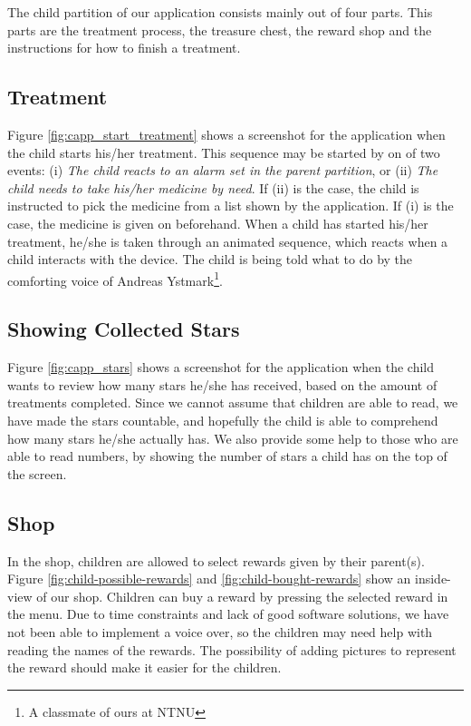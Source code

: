 The child partition of our application consists mainly out of four parts. This parts are the treatment process, the treasure chest, the reward shop and the instructions for how to finish a treatment.

\subsection{Treatment}
\label{sec:sec:description-treatment}
Figure \ref{fig:capp_start_treatment} shows a screenshot for the application when the child starts his/her treatment. This sequence may be started by on of two events: (i) \emph{The child reacts to an alarm set in the parent partition}, or (ii) \emph{The child needs to take his/her medicine by need}. If (ii) is the case, the child is instructed to pick the medicine from a list shown by the application. If (i) is the case, the medicine is given on beforehand. When a child has started his/her treatment, he/she is taken through an animated sequence, which reacts when a child interacts with the device. The child is being told what to do by the comforting voice of Andreas Ystmark\footnote{A classmate of ours at NTNU}.  


\subsection{Showing Collected Stars}
\label{sec:description-show-rewards}
Figure \ref{fig:capp_stars} shows a screenshot for the application when the child wants to review how many stars he/she has received, based on the amount of treatments completed. Since we cannot assume that children are able to read, we have made the stars countable, and hopefully the child is able to comprehend how many stars he/she actually has. We also provide some help to those who are able to read numbers, by showing the number of stars a child has on the top of the screen.      

\subsection{Shop}
\label{sec:description-shop}
In the shop, children are allowed to select rewards given by their parent(s). Figure \ref{fig:child-possible-rewards} and \ref{fig:child-bought-rewards} show an inside-view of our shop. Children can buy a reward by pressing the selected reward in the menu. Due to time constraints and lack of good software solutions, we have not been able to implement a voice over, so the children may need help with reading the names of the rewards. The possibility of adding pictures to represent the reward should make it easier for the children. 


